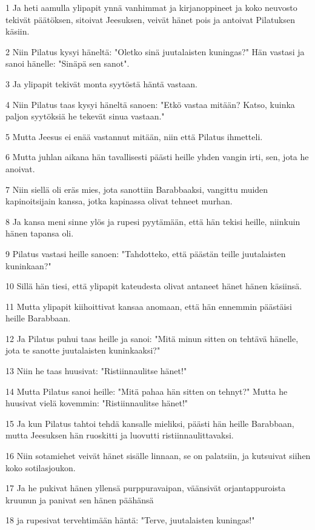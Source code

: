 \par 1 Ja heti aamulla ylipapit ynnä vanhimmat ja kirjanoppineet ja koko neuvosto tekivät päätöksen, sitoivat Jeesuksen, veivät hänet pois ja antoivat Pilatuksen käsiin.
\par 2 Niin Pilatus kysyi häneltä: "Oletko sinä juutalaisten kuningas?" Hän vastasi ja sanoi hänelle: "Sinäpä sen sanot".
\par 3 Ja ylipapit tekivät monta syytöstä häntä vastaan.
\par 4 Niin Pilatus taas kysyi häneltä sanoen: "Etkö vastaa mitään? Katso, kuinka paljon syytöksiä he tekevät sinua vastaan."
\par 5 Mutta Jeesus ei enää vastannut mitään, niin että Pilatus ihmetteli.
\par 6 Mutta juhlan aikana hän tavallisesti päästi heille yhden vangin irti, sen, jota he anoivat.
\par 7 Niin siellä oli eräs mies, jota sanottiin Barabbaaksi, vangittu muiden kapinoitsijain kanssa, jotka kapinassa olivat tehneet murhan.
\par 8 Ja kansa meni sinne ylös ja rupesi pyytämään, että hän tekisi heille, niinkuin hänen tapansa oli.
\par 9 Pilatus vastasi heille sanoen: "Tahdotteko, että päästän teille juutalaisten kuninkaan?"
\par 10 Sillä hän tiesi, että ylipapit kateudesta olivat antaneet hänet hänen käsiinsä.
\par 11 Mutta ylipapit kiihoittivat kansaa anomaan, että hän ennemmin päästäisi heille Barabbaan.
\par 12 Ja Pilatus puhui taas heille ja sanoi: "Mitä minun sitten on tehtävä hänelle, jota te sanotte juutalaisten kuninkaaksi?"
\par 13 Niin he taas huusivat: "Ristiinnaulitse hänet!"
\par 14 Mutta Pilatus sanoi heille: "Mitä pahaa hän sitten on tehnyt?" Mutta he huusivat vielä kovemmin: "Ristiinnaulitse hänet!"
\par 15 Ja kun Pilatus tahtoi tehdä kansalle mieliksi, päästi hän heille Barabbaan, mutta Jeesuksen hän ruoskitti ja luovutti ristiinnaulittavaksi.
\par 16 Niin sotamiehet veivät hänet sisälle linnaan, se on palatsiin, ja kutsuivat siihen koko sotilasjoukon.
\par 17 Ja he pukivat hänen yllensä purppuravaipan, väänsivät orjantappuroista kruunun ja panivat sen hänen päähänsä
\par 18 ja rupesivat tervehtimään häntä: "Terve, juutalaisten kuningas!"
